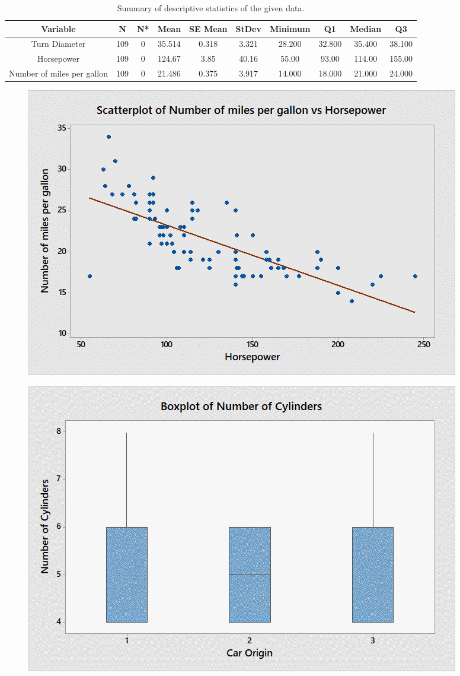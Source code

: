 \documentclass[10pt,a4paper]{article}
\begin{document}
\setcounter{page}{1}

\begin{table}
	\centering
	\caption{Summary of descriptive statistics of the given data.}
	\begin{tabular}{c|ccccccccc}
Variable & N & N*	& Mean	& SE Mean	& StDev	& Minimum	& Q1	& Median	& Q3 \\ \hline \hline
Turn Diameter	& 109	& 0	& 35.514	& 0.318	& 3.321	& 28.200	& 32.800	& 35.400	& 38.100 \\
Horsepower	& 109	& 0	& 124.67	& 3.85	& 40.16	& 55.00	& 93.00	& 114.00	& 155.00 \\
Number of miles per gallon	& 109	& 0	& 21.486	& 0.375	& 3.917	& 14.000	& 18.000	& 21.000	& 24.000
	\end{tabular}
	\label{tab:summary}
\end{table}

\begin{figure}
	\centering
	\includegraphics[width=0.75\linewidth]{mpg_vs_hp.png}
	\label{fig:scatter-mpg-vs-hp}
	\caption{}
\end{figure}

\begin{figure}
	\centering
	\includegraphics[width=0.75\linewidth]{box-cyl_vs_orig.png}
	\label{fig:cyl-vs-orig}
	\caption{}
\end{figure}
\end{document}
